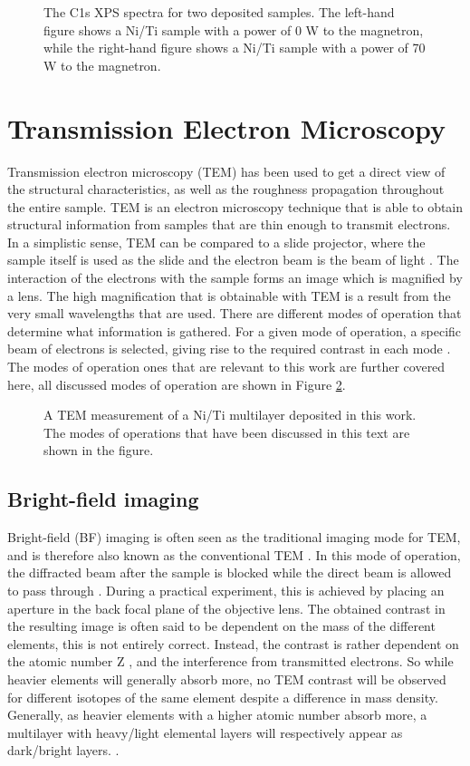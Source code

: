 \begin{figure}
	\centering
	\def\svgwidth{\textwidth}
	
	\caption{The C1s XPS spectra for two deposited samples. The left-hand figure shows a Ni/Ti sample with a power of 0 W to the  \natBC  magnetron, while the right-hand figure shows a Ni/Ti sample with a power of 70 W to the \natBC magnetron.}
	\label{XPS}
\end{figure}
\section{Transmission Electron Microscopy}\label{TEM}
Transmission electron microscopy (TEM) has been used to get a direct view of the structural characteristics, as well as the roughness propagation throughout the entire sample. TEM is an electron microscopy technique that is able to obtain structural information from samples that are thin enough to transmit electrons. In a simplistic sense, TEM can be compared to a slide projector, where the sample itself is used as the slide and the electron beam is the beam of light \cite{ohring}. The interaction of the electrons with the sample forms an image which is magnified by a lens. The high magnification that is obtainable with TEM is a result from the very small wavelengths that are used. There are different modes of operation that determine what information is gathered. For a given mode of operation, a specific beam of electrons is selected, giving rise to the required contrast in each mode \cite{TEM_new}. The modes of operation ones that are relevant to this work are further covered here, all discussed modes of operation are shown in Figure \ref{TEMfig}.
\begin{figure}[h]
	\centering
	\def\svgwidth{\textwidth}
	
	\caption{A TEM measurement of a Ni/Ti multilayer deposited in this work. The modes of operations that have been discussed in this text are shown in the figure.}
\label{TEMfig}
\end{figure}
\subsection{Bright-field imaging}
Bright-field (BF) imaging is often seen as the traditional imaging mode for TEM, and is therefore also known as the conventional TEM \cite{ohring}. In this mode of operation, the diffracted beam after the sample is blocked while the direct beam is allowed to pass through \cite{TEM_new}. During a practical experiment, this is achieved by placing an aperture in the back focal plane of the objective lens. The obtained contrast in the resulting image is often said to be dependent on the mass of the different elements, this is not entirely correct. Instead, the contrast is rather dependent on the atomic number Z \cite{spence2013high}, and the interference from transmitted electrons. So while heavier elements will generally absorb more, no TEM contrast will be observed for different isotopes of the same element despite a difference in mass density. Generally, as heavier elements with a higher atomic number absorb more, a multilayer with heavy/light elemental layers will respectively appear as dark/bright layers. \cite{thesis_naureen}. 

